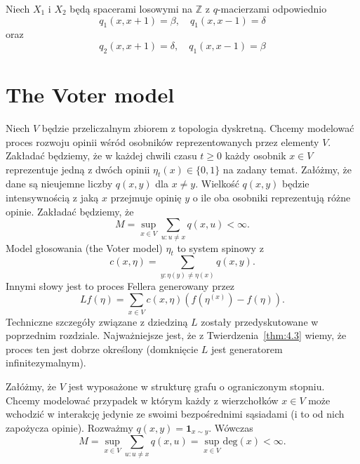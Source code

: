 \documentclass{article}
\begin{document}
\begin{pd}
	Niech $X_1$ i $X_2$ będą spacerami losowymi na $\mathbb{Z}$ z $q$-macierzami odpowiednio
	\begin{equation*}
		q_1(x, x+1) = \beta, \quad q_1(x, x-1) = \delta
	\end{equation*}
	oraz
	\begin{equation*}
		q_2(x, x+1) = \delta, \quad q_1(x, x-1) = \beta
	\end{equation*}
\end{pd}

\section{The Voter model}

Niech $V$ będzie przeliczalnym zbiorem z topologia dyskretną. Chcemy modelować
proces rozwoju opinii wśród osobników reprezentowanych przez elementy $V$. 
Zakładać będziemy, że w każdej chwili czasu $ t \geq 0$ każdy osobnik $x \in V$ 
reprezentuje jedną 
z dwóch opinii $\eta_t(x) \in \{0,1\}$ na zadany temat. 
Załóżmy, że dane są nieujemne liczby $q(x, y)$ dla $x \neq y$. 
Wielkość $q(x,y)$ będzie intensywnością z jaką $x$ przejmuje opinię $y$ o ile oba osobniki 
reprezentują różne opinie. Zakładać będziemy, że
\[
	M = \sup_{x\in V} \sum_{u : u \neq x} q(x, u) < \infty.
\]
Model głosowania (the Voter model) $\eta_t$ to system spinowy z
\[
	c(x, \eta) = \sum_{y : \eta(y) \neq \eta(x)} q(x, y).
\]
Innymi słowy jest to proces Fellera generowany przez
\begin{equation*}
	Lf(\eta) = \sum_{x \in V} c(x, \eta) \left( f\left(\eta^{(x)} \right) - f(\eta) \right).
\end{equation*}
Techniczne szczegóły związane z dziedziną $L$ zostały przedyskutowane w poprzednim rozdziale.  
Najważniejsze jest, że z Twierdzenia~\ref{thm:4.3} wiemy, że proces ten jest dobrze określony 
(domknięcie $L$ jest generatorem infinitezymalnym). 

\begin{pd}
	Załóżmy, że $V$ jest wyposażone w strukturę grafu o ograniczonym stopniu. 
	Chcemy modelować przypadek w którym każdy z wierzchołków $x \in V$ może wchodzić
	w interakcję jedynie ze swoimi bezpośrednimi sąsiadami (i to od nich zapożycza opinie).
	Rozważmy $q(x,y) = \mathbf{1}_{x \sim y}$.
	Wówczas
	\begin{equation*}
		M = \sup_{x \in V} \sum_{u: u \neq x} q(x,u) = \sup_{x\in V} \mathrm{deg}(x) <\infty.
	\end{equation*}
\end{pd}
\end{document}
